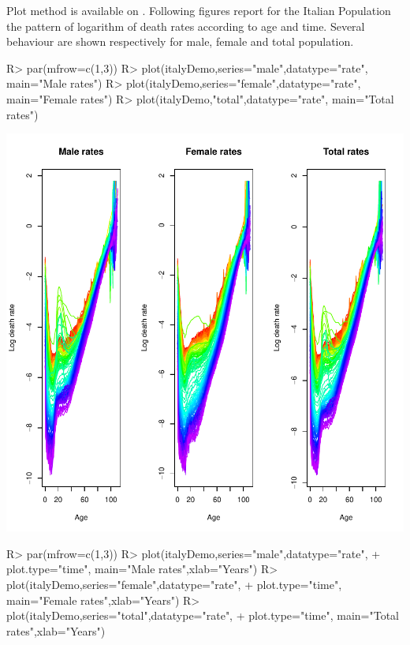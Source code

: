 \documentclass[nojss]{jss}
\begin{document}
Plot method is available on . Following figures report for the Italian Population the pattern of logarithm of death rates according to age and time. Several behaviour are shown respectively for male, female and total population. 

\begin{Schunk}
\begin{Sinput}
R> par(mfrow=c(1,3))
R> plot(italyDemo,series="male",datatype="rate", main="Male rates")
R> plot(italyDemo,series="female",datatype="rate", main="Female rates")
R> plot(italyDemo,"total",datatype="rate", main="Total rates")
\end{Sinput}
\end{Schunk}
\includegraphics{mortality_projection-italyDemoFig}
\begin{Schunk}
\begin{Sinput}
R> par(mfrow=c(1,3))
R> plot(italyDemo,series="male",datatype="rate",
+       plot.type="time", main="Male rates",xlab="Years")
R> plot(italyDemo,series="female",datatype="rate",
+       plot.type="time", main="Female rates",xlab="Years")
R> plot(italyDemo,series="total",datatype="rate",
+       plot.type="time", main="Total rates",xlab="Years")
\end{Sinput}
\end{Schunk}
\end{document}
